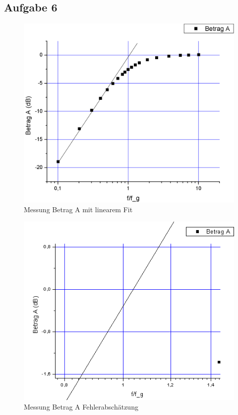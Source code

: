 \documentclass[12pt,a4paper]{article}
\begin{document}
\begin{multicols}{2}
\subsection{Aufgabe 6}
\begin{figure}[H]
	\centering
	\includegraphics[scale=0.25]{./figure/betrag_a.png}
	\caption{Messung Betrag A mit linearem Fit}
	\label{fig:betraga_linfit}
\end{figure}
\begin{figure}[H]
	\centering
	\includegraphics[scale=0.45]{./figure/betrag_a_zoom.png}
	\caption{Messung Betrag A Fehlerabschätzung}
	\label{fig:betraga_abweichung}
\end{figure}


\end{multicols}
\end{document}
